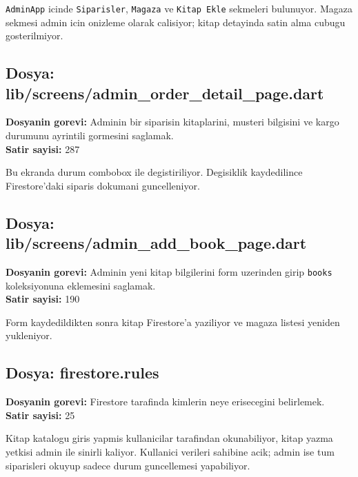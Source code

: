 \documentclass[12pt,a4paper]{article}
\begin{document}


\verb|AdminApp| icinde \verb|Siparisler|, \verb|Magaza| ve \verb|Kitap Ekle| sekmeleri bulunuyor. Magaza sekmesi admin icin onizleme olarak calisiyor; kitap detayinda satin alma cubugu gosterilmiyor.

\subsection{Dosya: lib/screens/admin\_order\_detail\_page.dart}

\textbf{Dosyanin gorevi:} Adminin bir siparisin kitaplarini, musteri bilgisini ve kargo durumunu ayrintili gormesini saglamak.\\
\textbf{Satir sayisi:} 287



Bu ekranda durum combobox ile degistiriliyor. Degisiklik kaydedilince Firestore'daki siparis dokumani guncelleniyor.

\subsection{Dosya: lib/screens/admin\_add\_book\_page.dart}

\textbf{Dosyanin gorevi:} Adminin yeni kitap bilgilerini form uzerinden girip \verb|books| koleksiyonuna eklemesini saglamak.\\
\textbf{Satir sayisi:} 190



Form kaydedildikten sonra kitap Firestore'a yaziliyor ve magaza listesi yeniden yukleniyor.

\subsection{Dosya: firestore.rules}

\textbf{Dosyanin gorevi:} Firestore tarafinda kimlerin neye erisecegini belirlemek.\\
\textbf{Satir sayisi:} 25



Kitap katalogu giris yapmis kullanicilar tarafindan okunabiliyor, kitap yazma yetkisi admin ile sinirli kaliyor. Kullanici verileri sahibine acik; admin ise tum siparisleri okuyup sadece durum guncellemesi yapabiliyor.
\end{document}
